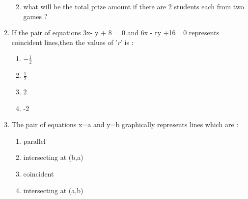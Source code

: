 \documentclass[12pt,-letter paper]{article}
\begin{document}
\begin{enumerate}
\begin{enumerate}[label=(\roman*)]
\begin{enumerate}[label=(\alph*)]
    \end{enumerate}
    \item what will be the total prize amount if there are 2 students each from two games ?
\end{enumerate}
\item If the pair of equations 3x- y + 8 = 0 and 6x - ry +16 =0 represents coincident lines,then the values of '\textit{r}' is :
\begin{enumerate}[label=(\alph*)]
    \item $-\frac{1}{2}$
    \item $\frac{1}{2}$
    \item 2
    \item -2
\end{enumerate}
\item The pair of equations x=a and y=b graphically represents lines which are :
\begin{enumerate}[label=(\alph*)]
    \item parallel
    \item intersecting at (b,a)
    \item coincident
    \item intersecting at (a,b)
    

\end{enumerate}
\end{enumerate}
\end{document}
